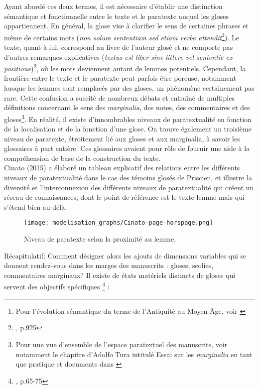 \documentclass[a4paper, twoside, 12pt]{book}
\begin{document}
Ayant abordé ces deux termes, il est nécessaire d'établir une distinction sémantique et fonctionnelle entre le texte et le paratexte auquel les gloses appartiennent. En général, la glose vise à clarifier le sens de certaines phrases et même de certains mots (\textit{non solum sententiam sed etiam verba attendit}\footnote{Pour l'évolution sémantique du terme de l'Antiquité au Moyen Âge, voir \cite{holtz1996glossaires}}). Le texte, quant à lui, correspond au livre de l'auteur glosé et ne comporte pas d'autres remarques explicatives (\textit{textus est liber sine littere vel sententie ex positione})\footnote{\cite{dinkova2020text}, p.925}, où les mots deviennent autant de lemmes potentiels. Cependant, la frontière entre le texte et le paratexte peut parfois être poreuse, notamment lorsque les lemmes sont remplacés par des gloses, un phénomène certainement pas rare. Cette confusion a suscité de nombreux débats et entraîné de multiples définitions concernant le sens des \textit{marginalia}, des notes, des commentaires et des gloses\footnote{Pour une vue d'ensemble de l'espace paratextuel des manuscrits, voir notamment le chapitre d'Adolfo Tura intitulé \og{}Essai sur les \textit{marginalia} en tant que pratique et documents\fg{} dans \cite{jacquart2005scientia}}. En réalité, il existe d'innombrables \og{}niveaux de paratextualité\fg{} en fonction de la localisation et de la fonction d'une glose. On trouve également un troisième niveau de paratexte, étroitement lié aux gloses et aux marginalia, à savoir les glossaires à part entière. Ces glossaires avaient pour rôle de fournir une aide à la compréhension de base de la construction du texte.\\

Cinato (2015) a élaboré un tableau explicatif des relations entre les différents niveaux de paratextualité dans le cas des témoins glosés de Priscien, et illustre la diversité et l'interconnexion des différents niveaux de paratextualité qui créent un réseau de connaissances, dont le point de référence est le texte-lemme mais qui s'étend bien au-délà.

\begin{figure}[ht]
  \centering
  \texttt{[image: modelisation\_graphs/Cinato-page-horspage.png]}
  \caption{Niveau de paratexte selon la proximité au lemme.}
  \label{fig:exemple}
\end{figure}

Récapitulatif: Comment désigner alors les ajouts de dimensions variables qui se donnent rendez-vous dans les marges des manuscrits : gloses, scolies, commentaires marginaux? Il existe de états matériels distincts de gloses qui servent des objectifs spécifiques \footnote{\cite{holtz1995glosse}, p.65-75} :
\end{document}
